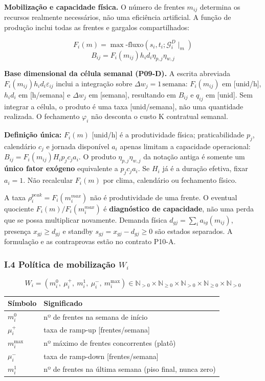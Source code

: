 \documentclass[
  10pt,
]{article}
\begin{document}
\textbf{Mobilização e capacidade física.} O número de frentes
\(m_{ij}\) determina os recursos realmente necessários, não uma
eficiência artificial. A função de produção inclui todas as frentes e
gargalos compartilhados:

\[\boxed{F_i(m)=\max\text{-fluxo}(s_i,t_i;\mathcal G_i^D\mid_m)}\]
\[\boxed{B_{ij}=F_i(m_{ij})h_id_i\eta_{p,j}\eta_{w,j}}\]

\noindent\textbf{Base dimensional da célula semanal (P09-D).}
A escrita abreviada \(F_i(m_{ij})h_id_i\varepsilon_{ij}\)
inclui a integração sobre \(\Delta w_j=1\,\mathrm{semana}\):
\(F_i(m_{ij})\) em {[}unid/h{]}, \(h_id_i\) em
{[}h/semana{]} e \(\Delta w_j\) em {[}semana{]},
resultando em \(B_{ij}\) e \(q_{ij}\) em {[}unid{]}.
Sem integrar a célula, o produto é uma taxa
{[}unid/semana{]}, não uma quantidade realizada. O fechamento
\(\varphi_i\) não desconta o custo K contratual semanal.

\noindent\textbf{Definição única:} \(F_i(m)\) [unid/h] é a
produtividade física; praticabilidade \(p_j\), calendário \(c_j\) e
jornada disponível \(a_i\) apenas limitam a capacidade operacional:
\(B_{ij}=F_i(m_{ij})H_i p_j c_j a_i\).
O produto \(\eta_{p,j}\eta_{w,j}\) da notação antiga é somente um
\textbf{único fator exógeno} equivalente a \(p_jc_ja_i\).
Se \(H_i\) já é a duração efetiva, fixar \(a_i=1\).
Não recalcular \(F_i(m)\) por clima, calendário ou fechamento físico.



A taxa \(\rho_i^{peak}=F_i(m_i^{max})\) não é produtividade de uma
frente. O eventual quociente \(F_i(m)/F_i(m_i^{max})\) é
\textbf{diagnóstico de capacidade}, não uma perda que se possa multiplicar
novamente. Demanda física \(d_{gj}=\sum_i a_{ig}(m_{ij})\), presença
\(x_{gj}\ge d_{gj}\) e standby \(s_{gj}=x_{gj}-d_{gj}\ge0\) são estados
separados. A formulação e as contraprovas estão no contrato P10-A.

\hypertarget{i.4-poluxedtica-de-mobilizauxe7uxe3o-w_i}{%
\subsubsection{\texorpdfstring{I.4 Política de mobilização
\(W_i\)}{I.4 Política de mobilização W\_i}}\label{i.4-poluxedtica-de-mobilizauxe7uxe3o-w_i}}

\[W_i = (m_i^0,\ \mu_i^+,\ m_i^1,\ \mu_i^-,\ m_i^{\max}) \in \mathbb{N}_{>0}\times\mathbb{N}_{\ge0}\times\mathbb{N}_{>0}\times\mathbb{N}_{\ge0}\times\mathbb{N}_{>0}\]

\begin{longtable}[]{@{}ll@{}}
\toprule\noalign{}
Símbolo & Significado \\
\midrule\noalign{}
\endhead
\bottomrule\noalign{}
\endlastfoot
\(m_i^0\) & nº de frentes na semana de início \\
\(\mu_i^+\) & taxa de ramp-up {[}frentes/semana{]} \\
\(m_i^{\max}\) & nº máximo de frentes concorrentes (platô) \\
\(\mu_i^-\) & taxa de ramp-down {[}frentes/semana{]} \\
\(m_i^1\) & nº de frentes na última semana (piso final, nunca zero) \\
\end{longtable}
\end{document}
